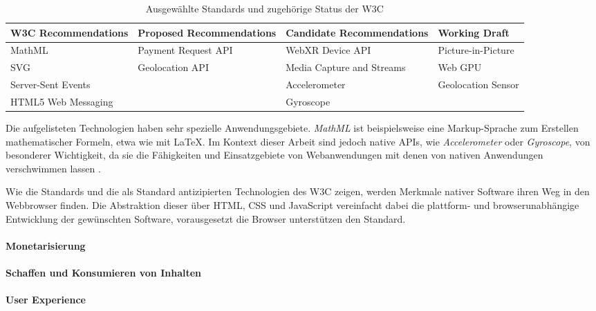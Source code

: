 \documentclass[a4paper]{scrartcl}
\begin{document}
\begin{table}[H]
	\centering
	\caption{Ausgewählte Standards und zugehörige Status der W3C}
	\begin{center}
		\begin{tabularx}{\linewidth}{| Y | Y | Y | Y |}
			\hline
			\textbf{W3C Recommendations} & \textbf{Proposed Recommendations} & \textbf{Candidate Recommendations} & \textbf{Working Draft} \\
			\hline \hline
			MathML & Payment Request API & WebXR Device API & Picture-in-Picture \\
			\hline
			SVG & Geolocation API & Media Capture and Streams & Web GPU \\
			\hline
			Server-Sent Events & & Accelerometer & Geolocation Sensor \\
			\hline
			HTML5 Web Messaging & & Gyroscope & \\
			\hline
		\end{tabularx}
	\end{center}	
	Die aufgelisteten Technologien haben sehr spezielle Anwendungsgebiete. \textit{MathML} ist beispielsweise eine Markup-Sprache zum Erstellen mathematischer Formeln, etwa wie mit \LaTeX. Im Kontext dieser Arbeit sind jedoch native APIs, wie \textit{Accelerometer} oder \textit{Gyroscope}, von besonderer Wichtigkeit, da sie die Fähigkeiten und Einsatzgebiete von Webanwendungen mit denen von nativen Anwendungen verschwimmen lassen \autocite{W3C}.
\end{table}

Wie die Standards und die als Standard antizipierten Technologien des W3C zeigen, werden Merkmale nativer Software ihren Weg in den Webbrowser finden. Die Abstraktion dieser über HTML, CSS und JavaScript vereinfacht dabei die plattform- und browserunabhängige Entwicklung der gewünschten Software, vorausgesetzt die Browser unterstützen den Standard. 


\paragraph{Monetarisierung}

\paragraph{Schaffen und Konsumieren von Inhalten}

\paragraph{User Experience}
\end{document}
